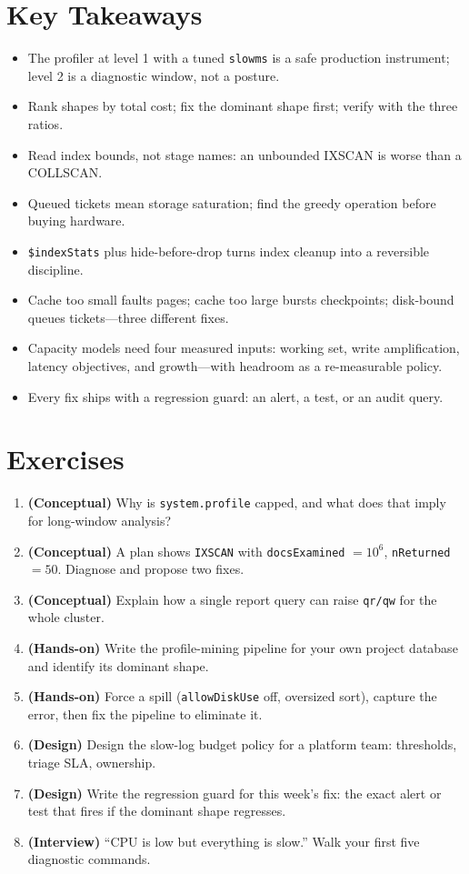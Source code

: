 \section*{Key Takeaways}
\begin{itemize}
    \item The profiler at level 1 with a tuned \texttt{slowms} is a safe production instrument; level 2 is a diagnostic window, not a posture.
    \item Rank shapes by total cost; fix the dominant shape first; verify with the three ratios.
    \item Read index bounds, not stage names: an unbounded IXSCAN is worse than a COLLSCAN.
    \item Queued tickets mean storage saturation; find the greedy operation before buying hardware.
    \item \texttt{\$indexStats} plus hide-before-drop turns index cleanup into a reversible discipline.
    \item Cache too small faults pages; cache too large bursts checkpoints; disk-bound queues tickets---three different fixes.
    \item Capacity models need four measured inputs: working set, write amplification, latency objectives, and growth---with headroom as a re-measurable policy.
    \item Every fix ships with a regression guard: an alert, a test, or an audit query.
\end{itemize}

\section{Exercises}
\begin{enumerate}
    \item \textbf{(Conceptual)} Why is \texttt{system.profile} capped, and what does that imply for long-window analysis?
    \item \textbf{(Conceptual)} A plan shows \texttt{IXSCAN} with \texttt{docsExamined} $= 10^6$, \texttt{nReturned} $= 50$. Diagnose and propose two fixes.
    \item \textbf{(Conceptual)} Explain how a single report query can raise \texttt{qr/qw} for the whole cluster.
    \item \textbf{(Hands-on)} Write the profile-mining pipeline for your own project database and identify its dominant shape.
    \item \textbf{(Hands-on)} Force a spill (\texttt{allowDiskUse} off, oversized sort), capture the error, then fix the pipeline to eliminate it.
    \item \textbf{(Design)} Design the slow-log budget policy for a platform team: thresholds, triage SLA, ownership.
    \item \textbf{(Design)} Write the regression guard for this week's fix: the exact alert or test that fires if the dominant shape regresses.
    \item \textbf{(Interview)} ``CPU is low but everything is slow.'' Walk your first five diagnostic commands.
\end{enumerate}

